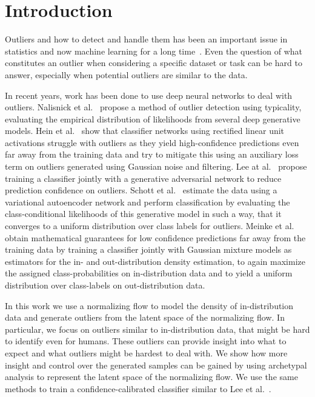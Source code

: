 \chapter{Introduction}%
\label{cha:introduction}
Outliers and how to detect and handle them has been an important issue in
statistics and now machine learning for a long
time~\citep{zimekThereBackAgain2018}. Even the question of what constitutes an
outlier when considering a specific dataset or task can be hard to answer,
especially when potential outliers are similar to the data. 

In recent years, work has been done to use deep neural networks to deal with
outliers. Nalisnick et
al.~\citep{nalisnickDetectingOutofDistributionInputs2019} propose a method of
outlier detection using typicality, evaluating the empirical distribution of
likelihoods from several deep generative models. Hein et
al.~\citep{heinWhyReLUNetworks2019} show that classifier networks using
rectified linear unit activations struggle with outliers as they yield
high-confidence predictions even far away from the training data and try to
mitigate this using an auxiliary loss term on outliers generated using
Gaussian noise and filtering. Lee at
al.~\citep{leeTrainingConfidencecalibratedClassifiers2018} propose training a
classifier jointly with a generative adversarial network to reduce prediction
confidence on outliers. Schott et
al.~\citep{schottFirstAdversariallyRobust2018} estimate the data using a
variational autoencoder network and perform classification by evaluating the
class-conditional likelihoods of this generative model in such a way, that it
converges to a uniform distribution over class labels for outliers. Meinke et
al.~\citep{meinkeNeuralNetworksThat2019} obtain mathematical guarantees for low
confidence predictions far away from the training data by training a classifier
jointly with Gaussian mixture models as estimators for the in- and
out-distribution density estimation, to again maximize the assigned
class-probabilities on in-distribution data and to yield a uniform distribution
over class-labels on out-distribution data.

In this work we use a normalizing flow to model the density of in-distribution
data and generate outliers from the latent space of the normalizing flow. In
particular, we focus on outliers similar to in-distribution data, that might be
hard to identify even for humans. These outliers can provide insight into what
to expect and what outliers might be hardest to deal with. We show how more
insight and control over the generated samples can be gained by using
archetypal analysis to represent the latent space of the normalizing flow. We
use the same methods to train a confidence-calibrated classifier similar to Lee
et al.~\citep{leeTrainingConfidencecalibratedClassifiers2018}.

